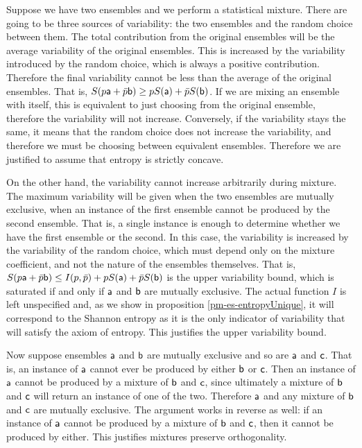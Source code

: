 \begin{mathSection}
\begin{justification}
	Suppose we have two ensembles and we perform a statistical mixture. There are going to be three sources of variability: the two ensembles and the random choice between them. The total contribution from the original ensembles will be the average variability of the original ensembles. This is increased by the variability introduced by the random choice, which is always a positive contribution. Therefore the final variability cannot be less than the average of the original ensembles. That is, $S(p\ens[a] + \bar{p} \ens[b]) \geq p S(\ens[a]) + \bar{p} S(\ens[b])$. If we are mixing an ensemble with itself, this is equivalent to just choosing from the original ensemble, therefore the variability will not increase. Conversely, if the variability stays the same, it means that the random choice does not increase the variability, and therefore we must be choosing between equivalent ensembles. Therefore we are justified to assume that entropy is strictly concave.
	
	On the other hand, the variability cannot increase arbitrarily during mixture. The maximum variability will be given when the two ensembles are mutually exclusive, when an instance of the first ensemble cannot be produced by the second ensemble. That is, a single instance is enough to determine whether we have the first ensemble or the second. In this case, the variability is increased by the variability of the random choice, which must depend only on the mixture coefficient, and not the nature of the ensembles themselves. That is, $S(p\ens[a] + \bar{p} \ens[b]) \leq I(p, \bar{p}) + p S(\ens[a]) + \bar{p} S(\ens[b])$ is the upper variability bound, which is saturated if and only if $\ens[a]$ and $\ens[b]$ are mutually exclusive. The actual function $I$ is left unspecified and, as we show in proposition \ref{pm-es-entropyUnique}, it will correspond to the Shannon entropy as it is the only indicator of variability that will satisfy the axiom of entropy. This justifies the upper variability bound.
	
	Now suppose ensembles $\ens[a]$ and $\ens[b]$ are mutually exclusive and so are $\ens[a]$ and $\ens[c]$. That is, an instance of $\ens[a]$ cannot ever be produced by either $\ens[b]$ or $\ens[c]$. Then an instance of $\ens[a]$ cannot be produced by a mixture of $\ens[b]$ and $\ens[c]$, since ultimately a mixture of $\ens[b]$ and $\ens[c]$ will return an instance of one of the two. Therefore $\ens[a]$ and any mixture of $\ens[b]$ and $\ens[c]$ are mutually exclusive. The argument works in reverse as well: if an instance of $\ens[a]$ cannot be produced by a mixture of $\ens[b]$ and $\ens[c]$, then it cannot be produced by either. This justifies mixtures preserve orthogonality.
\end{justification}
\end{mathSection}

